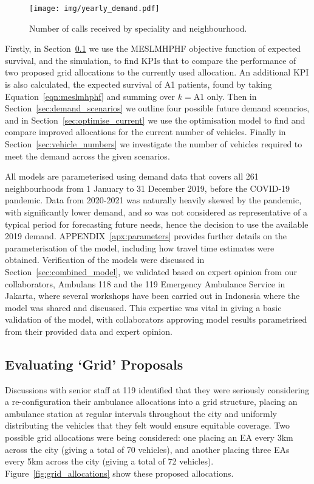 \documentclass[numbers,webpdf,imaman]{ima-authoring-template}%
\begin{document}
\begin{figure}
\begin{center}
\texttt{[image: img/yearly\_demand.pdf]}
\end{center}
\caption{Number of calls received by speciality and neighbourhood.}
\label{fig:yearly_demand}
\end{figure}


Firstly, in Section~\ref{sec:analysis_grid} we use the MESLMHPHF objective
function of expected survival, and the simulation, to find KPIs that to compare
the performance of two proposed grid allocations to the currently used
allocation. An additional KPI is also calculated, the expected survival of A1
patients, found by taking Equation~\ref{eqn:meslmhphf} and summing over
$k = \text{A1}$ only.
Then in Section~\ref{sec:demand_scenarios} we outline four possible
future demand scenarios, and in Section~\ref{sec:optimise_current} we use the
optimisation model to find and compare improved allocations for the current
number of vehicles. Finally in Section~\ref{sec:vehicle_numbers} we investigate
the number of vehicles required to meet the demand across the given scenarios.

All models are parameterised using demand data that covers all 261
neighbourhoods from 1 January to 31 December 2019, before the COVID-19
pandemic. Data from 2020-2021 was naturally heavily skewed by the pandemic,
with significantly lower demand, and so was not considered as representative
of a typical period for forecasting future needs, hence the decision to use
the available 2019 demand. APPENDIX~\ref{apx:parameters}
provides further details on the parameterisation of the model, including how
travel time estimates were obtained.
Verification of the models were discussed in
Section~\ref{sec:combined_model}, we validated based on expert opinion from
our collaborators, Ambulans 118 and the 119 Emergency Ambulance Service in
Jakarta, where several workshops have been carried out in Indonesia where the
model was shared and discussed. This expertise was vital in giving a basic
validation of the model, with collaborators approving model results
parametrised from their provided data and expert opinion.


\subsection{Evaluating `Grid' Proposals}\label{sec:analysis_grid}
Discussions with senior staff at 119 identified that they were seriously
considering a re-configuration their ambulance allocations into a grid
structure, placing an ambulance station at regular intervals throughout the city
and uniformly distributing the vehicles that they felt would ensure equitable
coverage. Two possible grid allocations were being considered: one placing an
EA every 3km across the city (giving a total of 70 vehicles), and another
placing three EAs every 5km across the city (giving a total of 72 vehicles).
Figure~\ref{fig:grid_allocations} show these proposed allocations.
\end{document}
